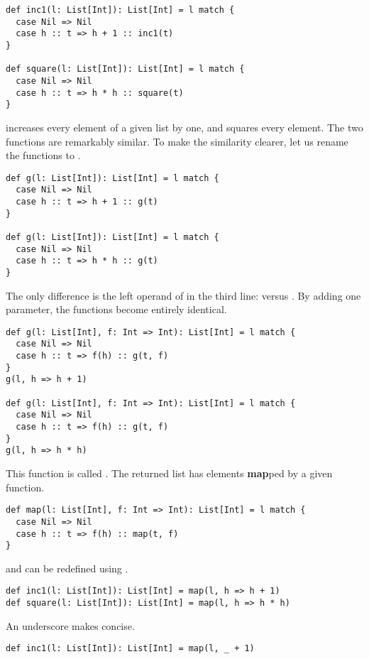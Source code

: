 \begin{verbatim}
def inc1(l: List[Int]): List[Int] = l match {
  case Nil => Nil
  case h :: t => h + 1 :: inc1(t)
}

def square(l: List[Int]): List[Int] = l match {
  case Nil => Nil
  case h :: t => h * h :: square(t)
}
\end{verbatim}

 increases every element of a given list by one, and 
squares every element. The two functions are remarkably similar. To make the
similarity clearer, let us rename the functions to .

\begin{verbatim}
def g(l: List[Int]): List[Int] = l match {
  case Nil => Nil
  case h :: t => h + 1 :: g(t)
}

def g(l: List[Int]): List[Int] = l match {
  case Nil => Nil
  case h :: t => h * h :: g(t)
}
\end{verbatim}

The only difference is the left operand of \code{::} in the third line:
 versus . By adding one parameter, the functions become
entirely identical.

\begin{verbatim}
def g(l: List[Int], f: Int => Int): List[Int] = l match {
  case Nil => Nil
  case h :: t => f(h) :: g(t, f)
}
g(l, h => h + 1)

def g(l: List[Int], f: Int => Int): List[Int] = l match {
  case Nil => Nil
  case h :: t => f(h) :: g(t, f)
}
g(l, h => h * h)
\end{verbatim}

This function is called . The returned list
has elements \textbf{map}ped by a given function.

\begin{verbatim}
def map(l: List[Int], f: Int => Int): List[Int] = l match {
  case Nil => Nil
  case h :: t => f(h) :: map(t, f)
}
\end{verbatim}

 and  can be redefined using .

\begin{verbatim}
def inc1(l: List[Int]): List[Int] = map(l, h => h + 1)
def square(l: List[Int]): List[Int] = map(l, h => h * h)
\end{verbatim}

An underscore makes  concise.

\begin{verbatim}
def inc1(l: List[Int]): List[Int] = map(l, _ + 1)
\end{verbatim}

